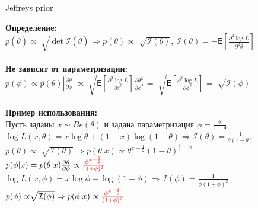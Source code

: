 \documentclass[10pt]{beamer}
\begin{document}
\begin{frame}{Jeffreys prior}

{\bf Определение:}\\
\quad
$p(\bar{\theta}) \propto \sqrt[]{\det\mathcal{I}(\bar{\theta})} \Rightarrow p(\theta) \propto \sqrt[]{\mathcal{I}(\theta)},~\mathcal{I}(\theta) = -\mathsf{E}\left[\frac{\partial^2 \log L}{\partial^2\theta}\right]$\\
	~\\
	
{\bf Не зависит от параметризации:}\\
\quad
$p(\phi) \propto p(\theta)\left|\frac{\partial\theta}{\partial\phi}\right| \propto \sqrt[]{\mathsf{E}\left[\frac{\partial^2\log L}{\partial\theta^2}\right]\frac{\partial\theta^2}{\partial\phi^2}} =  \sqrt[]{\mathsf{E}\left[\frac{\partial^2\log L}{\partial\phi^2}\right]} = \sqrt[]{\mathcal{I}(\phi)}$\\
	~\\
{\bf Пример использования:}\\
\quad 
Пусть заданы $x \sim Be(\theta)$ и задана параметризация $\phi = \frac{\theta}{1-\theta}$\\
\quad
$\log L(x, \theta) = x\log\theta + (1-x)\log(1-\theta) \Rightarrow \mathcal{I}(\theta) = \frac{1}{\theta(1-\theta)}$\\
\quad
$p(\theta) \propto \sqrt[]{\mathcal{I}(\theta)} \Rightarrow p(\theta|x)\propto \theta^{x-\frac{1}{2}}(1-\theta)^{\frac{1}{2} - x}$\\
\quad
$p(\phi|x) = p(\theta|x)\frac{\partial\theta}{\partial\phi} \propto \textcolor[rgb]{1,0,0}{\frac{\phi^{x-\frac{1}{2}}}{(1+\phi)^2}}$\\
\quad
$\log L(x, \phi) = x\log\phi-\log(1+\phi) \Rightarrow \mathcal{I}(\phi) = \frac{1}{\phi(1+\phi)^2}$\\
\quad
$p(\phi)\propto \sqrt[]{\mathcal{I}(\phi)} \Rightarrow p(\phi|x)\propto \textcolor[rgb]{1,0,0}{\frac{\phi^{x-\frac{1}{2}}}{(1+\phi)^2}}$
	~\\
	
\end{frame}
\end{document}
